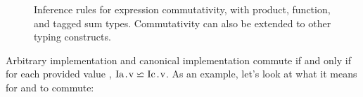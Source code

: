 \documentclass[12pt]{article}
\begin{document}
  \begin{figure}[H]
    \centering
    \begin{mathpar}




    \end{mathpar}
    \caption{Inference rules for expression commutativity, with product, function, and tagged sum types. Commutativity can also be extended to other typing constructs.}
  \end{figure}

  \noindent Arbitrary implementation  and canonical implementation  commute if and only if for each provided value , $\commutes{\code{Ia.v}}{\code{Ic.v}}$. As an example, let's look at what it means for  and  to commute:
\end{document}
